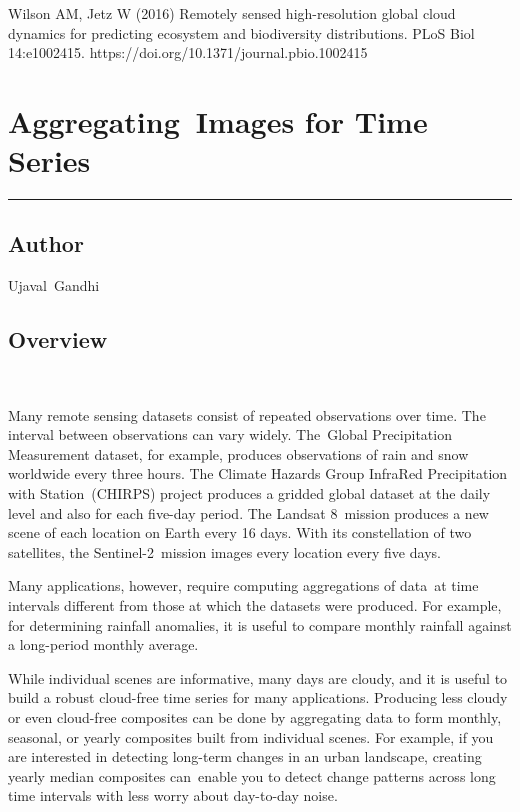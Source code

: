 \documentclass[
  letterpaper,
  DIV=11,
  numbers=noendperiod]{scrreprt}
\begin{document}

Wilson AM, Jetz W (2016) Remotely sensed high-resolution global cloud
dynamics for predicting ecosystem and biodiversity distributions. PLoS
Biol 14:e1002415. https://doi.org/10.1371/journal.pbio.1002415

\hypertarget{aggregating-images-for-time-series}{%
\chapter{Aggregating~Images for Time
Series}\label{aggregating-images-for-time-series}}

\begin{center}\rule{0.5\linewidth}{0.5pt}\end{center}

\hypertarget{author-7}{%
\section*{Author}\label{author-7}}


Ujaval~Gandhi

\hypertarget{overview-9}{%
\section*{Overview}\label{overview-9}}


~

Many remote sensing datasets consist of repeated observations over time.
The interval between observations can vary widely. The~Global
Precipitation Measurement dataset, for example, produces observations of
rain and snow worldwide every three hours. The Climate Hazards Group
InfraRed Precipitation with Station~(CHIRPS) project produces a gridded
global dataset at the daily level and also for each five-day period. The
Landsat 8~mission produces a new scene of each location on Earth every
16 days. With its constellation of two satellites, the
Sentinel-2~mission images every location every five days.

Many applications, however, require computing aggregations of data~at
time intervals different from those at which the datasets were produced.
For example, for determining rainfall anomalies, it is useful to compare
monthly rainfall against a long-period monthly average.

While individual scenes are informative, many days are cloudy, and it is
useful to build a robust cloud-free time series for many applications.
Producing less cloudy or even cloud-free composites can be done by
aggregating data to form monthly, seasonal, or yearly composites built
from individual scenes. For example, if you are interested in detecting
long-term changes in an urban landscape, creating yearly median
composites can~enable you to detect change patterns across long time
intervals with less worry about day-to-day noise.
\end{document}
